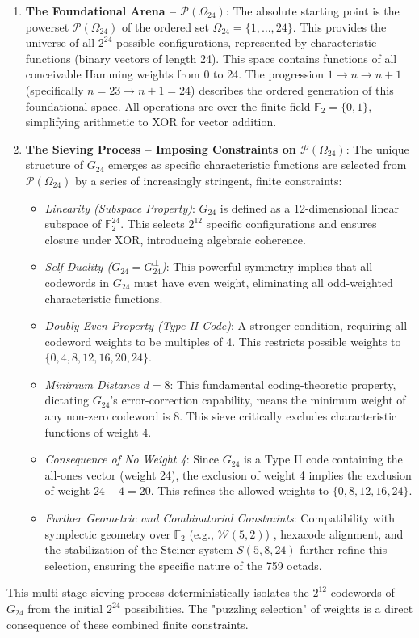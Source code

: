 \documentclass[11pt,a4paper]{article}
\begin{document}
\begin{enumerate}[label=\textbf{Step \arabic*:}, wide, labelwidth=!, labelindent=0pt]
    \item \textbf{The Foundational Arena -- $\mathcal{P}(\Omega_{24})$}: The absolute starting point is the powerset $\mathcal{P}(\Omega_{24})$ of the ordered set $\Omega_{24} = \{1, \dots, 24\}$. This provides the universe of all $2^{24}$ possible configurations, represented by characteristic functions (binary vectors of length 24). This space contains functions of all conceivable Hamming weights from 0 to 24. The progression $1 \to n \to n+1$ (specifically $n=23 \to n+1=24$) describes the ordered generation of this foundational space. All operations are over the finite field $\mathbb{F}_2 = \{0,1\}$, simplifying arithmetic to XOR for vector addition.

    \item \textbf{The Sieving Process -- Imposing Constraints on $\mathcal{P}(\Omega_{24})$}: The unique structure of $G_{24}$ emerges as specific characteristic functions are selected from $\mathcal{P}(\Omega_{24})$ by a series of increasingly stringent, finite constraints:
    \begin{itemize}
        \item \textit{Linearity (Subspace Property)}: $G_{24}$ is defined as a 12-dimensional linear subspace of $\mathbb{F}_2^{24}$. This selects $2^{12}$ specific configurations and ensures closure under XOR, introducing algebraic coherence.
        \item \textit{Self-Duality ($G_{24} = G_{24}^{\perp}$)}: This powerful symmetry implies that all codewords in $G_{24}$ must have even weight, eliminating all odd-weighted characteristic functions.
        \item \textit{Doubly-Even Property (Type II Code)}: A stronger condition, requiring all codeword weights to be multiples of 4. This restricts possible weights to $\{0, 4, 8, 12, 16, 20, 24\}$.
        \item \textit{Minimum Distance $d=8$}: This fundamental coding-theoretic property, dictating $G_{24}$'s error-correction capability, means the minimum weight of any non-zero codeword is 8. This sieve critically excludes characteristic functions of weight 4.
        \item \textit{Consequence of No Weight 4}: Since $G_{24}$ is a Type II code containing the all-ones vector (weight 24), the exclusion of weight 4 implies the exclusion of weight $24-4=20$. This refines the allowed weights to $\{0, 8, 12, 16, 24\}$.
        \item \textit{Further Geometric and Combinatorial Constraints}: Compatibility with symplectic geometry over $\mathbb{F}_2$ (e.g., $\mathcal{W}(5,2)$) \cite{Saniga2014}, hexacode alignment, and the stabilization of the Steiner system $S(5,8,24)$ further refine this selection, ensuring the specific nature of the 759 octads.
    \end{itemize}
\end{enumerate}
This multi-stage sieving process deterministically isolates the $2^{12}$ codewords of $G_{24}$ from the initial $2^{24}$ possibilities. The "puzzling selection" of weights is a direct consequence of these combined finite constraints.
\end{document}
